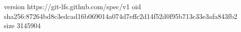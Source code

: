version https://git-lfs.github.com/spec/v1
oid sha256:87264bd8c3edcad16b069014a074d7effc2d14f52d0f95b713c33e3afa843fb2
size 3145904
